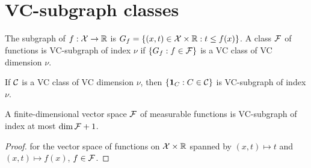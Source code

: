 \section{VC-subgraph classes}

\begin{definition}
  \label{def:han-4-10}
  The subgraph of $f:\mathcal{X}\to\mathbb{R}$ is $G_f=\{(x,t)\in\mathcal{X}\times\mathbb{R}:t\le f(x)\}$. A class $\mathcal{F}$ of functions is VC-subgraph of index $\nu$ if $\{G_f:f\in\mathcal{F}\}$ is a VC class of VC dimension $\nu$.
\end{definition}

\begin{lemma}
  \label{lem:han-exr-4-4}
  If $\mathcal{C}$ is a VC class of VC dimension $\nu$, then $\{\mathbf{1}_C:C\in\mathcal{C}\}$ is VC-subgraph of index $\nu$.
\end{lemma}

\begin{lemma}
  \label{lem:han-ex-4-6}
  A finite-dimensional vector space $\mathcal{F}$ of measurable functions is VC-subgraph of index at most $\dim\mathcal{F}+1$.
\end{lemma}
\begin{proof}
   for the vector space of functions on $\mathcal{X}\times\mathbb{R}$ spanned by $(x,t)\mapsto t$ and $(x,t)\mapsto f(x)$, $f\in\mathcal{F}$.
\end{proof}

